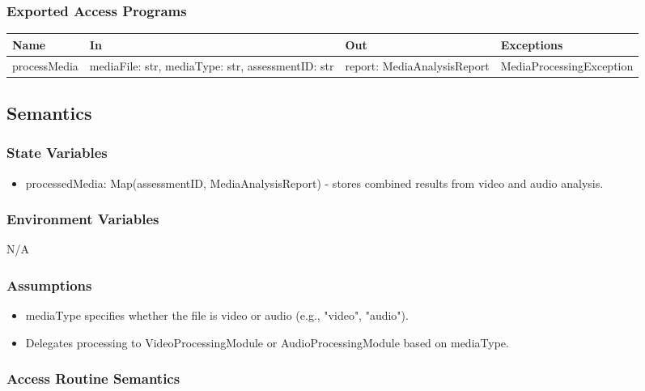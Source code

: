 \documentclass[12pt, titlepage]{article}
\begin{document}
\subsubsection{Exported Access Programs}
\begin{center}
  \begin{tabular}{p{3cm} p{4cm} p{4cm} p{5cm}}
  \hline
  \textbf{Name} & \textbf{In} & \textbf{Out} & \textbf{Exceptions} \\
  \hline
  processMedia & \raggedright\arraybackslash mediaFile: str, mediaType: str, assessmentID: str & \raggedright\arraybackslash report: MediaAnalysisReport & \raggedright\arraybackslash MediaProcessingException \\
  \end{tabular}
\end{center}

\subsection{Semantics}

\subsubsection{State Variables}
\begin{itemize}
\item processedMedia: Map(assessmentID, MediaAnalysisReport) - stores combined results from video and audio analysis.
\end{itemize}

\subsubsection{Environment Variables}
N/A

\subsubsection{Assumptions}
\begin{itemize}
\item mediaType specifies whether the file is video or audio (e.g., "video", "audio").
\item Delegates processing to VideoProcessingModule or AudioProcessingModule based on mediaType.
\end{itemize}

\subsubsection{Access Routine Semantics}
\end{document}
